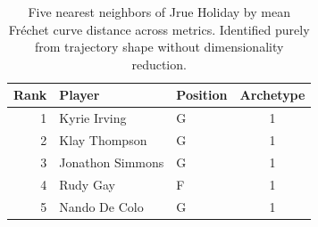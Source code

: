 \begin{table}[htbp]
  \centering\small
  \begin{tabular}{rllc}
    \toprule
    Rank & Player & Position & Archetype \\
    \midrule
    1 & Kyrie Irving & G & 1 \\
    2 & Klay Thompson & G & 1 \\
    3 & Jonathon Simmons & G & 1 \\
    4 & Rudy Gay & F & 1 \\
    5 & Nando De Colo & G & 1 \\
    \bottomrule
  \end{tabular}
  \caption{Five nearest neighbors of Jrue Holiday by mean Fr\'{e}chet curve distance across metrics. Identified purely from trajectory shape without dimensionality reduction.}
  \label{tab:Jrue_Holiday_frechet_curve_neighbors}
\end{table}

